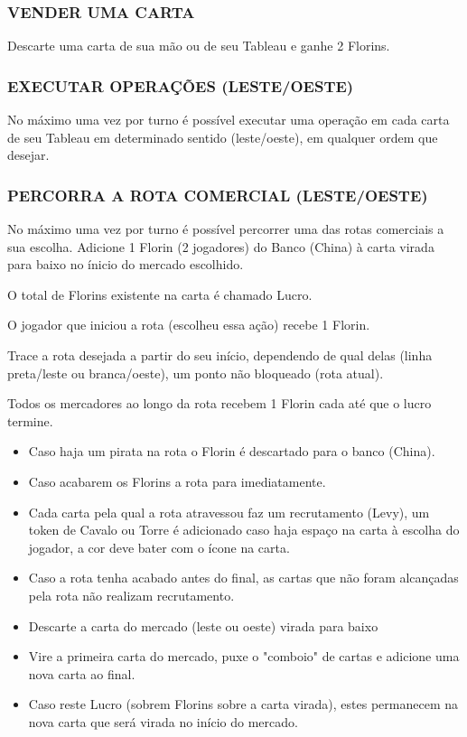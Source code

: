 \documentclass[11pt]{article}
\begin{document}
\subsubsection{VENDER UMA CARTA}
\label{sec:org1ff5166}

Descarte uma carta de sua mão ou de seu Tableau e ganhe 2 Florins.

\subsubsection{EXECUTAR OPERAÇÕES (LESTE/OESTE)}
\label{sec:org065e4a9}

No máximo uma vez por turno é possível executar uma operação em cada carta de seu Tableau em determinado sentido (leste/oeste), em qualquer ordem que desejar.

\subsubsection{PERCORRA A ROTA COMERCIAL (LESTE/OESTE)}
\label{sec:orge32c7d5}

No máximo uma vez por turno é possível percorrer uma das rotas comerciais a sua escolha. Adicione 1 Florin (2 jogadores) do Banco (China) à carta virada para baixo no ínicio do mercado escolhido.

O total de Florins existente na carta é chamado Lucro.

O jogador que iniciou a rota (escolheu essa ação) recebe 1 Florin.

Trace a rota desejada a partir do seu início, dependendo de qual delas (linha preta/leste ou branca/oeste), um ponto não bloqueado (rota atual).

Todos os mercadores ao longo da rota recebem 1 Florin cada até que o lucro termine.

\begin{itemize}
\item Caso haja um pirata na rota o Florin é descartado para o banco (China).

\item Caso acabarem os Florins a rota para imediatamente.

\item Cada carta pela qual a rota atravessou faz um recrutamento (Levy), um token de Cavalo ou Torre é adicionado caso haja espaço na carta à escolha do jogador, a cor deve bater com o ícone na carta.

\item Caso a rota tenha acabado antes do final, as cartas que não foram alcançadas pela rota não realizam recrutamento.

\item Descarte a carta do mercado (leste ou oeste) virada para baixo

\item Vire a primeira carta do mercado, puxe o "comboio" de cartas e adicione uma nova carta ao final.

\item Caso reste Lucro (sobrem Florins sobre a carta virada), estes permanecem na nova carta que será virada no início do  mercado.
\end{itemize}
\end{document}
